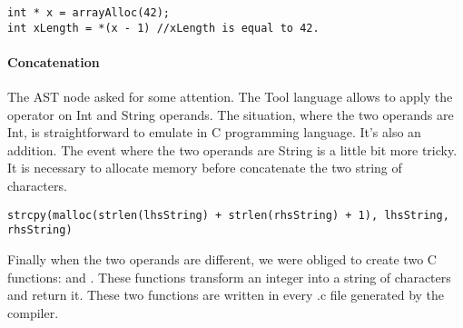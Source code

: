 \begin{lstlisting}
int * x = arrayAlloc(42);
int xLength = *(x - 1) //xLength is equal to 42.
\end{lstlisting}

\paragraph{Concatenation}
The AST node  asked for some attention.
The Tool language allows to apply the \say{+} operator on Int and String operands.
\newline
The situation, where the two operands are Int, is straightforward to emulate in C programming language.
It's also an addition.
\newline
The event where the two operands are String is a little bit more tricky.
It is necessary to allocate memory before concatenate the two string of characters.
\begin{lstlisting}
strcpy(malloc(strlen(lhsString) + strlen(rhsString) + 1), lhsString, rhsString)
\end{lstlisting}
Finally when the two operands are different, we were obliged to create two C functions:
\newline
\lstset{style=customc}{\lstinline[basicstyle=\small\ttfamily]|void helper_reverse_plus(char str[], int len)|} and
\lstset{style=customc}{\lstinline[basicstyle=\small\ttfamily]|char* itoa(int num)|}.
These functions transform an integer into a string of characters and return it.
\newline
These two functions are written in every .c file generated by the compiler.

